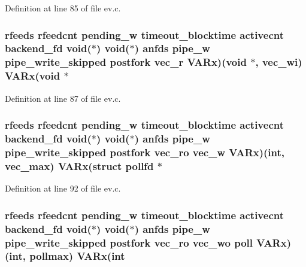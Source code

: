 \-Definition at line 85 of file ev.\-c.

\hypertarget{structev__loop_a0da6dfa7787cf08c7cc74dfa97686031}{
\subsubsection[{\-V\-A\-Rx}]{ {\bf rfeeds} {\bf rfeedcnt} {\bf pending\-\_\-w} {\bf timeout\-\_\-blocktime} {\bf activecnt} {\bf backend\-\_\-fd} void($\ast$) void($\ast$) {\bf anfds} {\bf pipe\-\_\-w} {\bf pipe\-\_\-write\-\_\-skipped} {\bf postfork} vec\-\_\-r {\bf \-V\-A\-Rx})(void $\ast$, {\bf vec\-\_\-wi}) {\bf \-V\-A\-Rx}(void $\ast$}}\label{structev__loop_a0da6dfa7787cf08c7cc74dfa97686031}


\-Definition at line 87 of file ev.\-c.

\hypertarget{structev__loop_a1207f4fd0019e46e4b57c9ae96b9cdd7}{
\subsubsection[{\-V\-A\-Rx}]{ {\bf rfeeds} {\bf rfeedcnt} {\bf pending\-\_\-w} {\bf timeout\-\_\-blocktime} {\bf activecnt} {\bf backend\-\_\-fd} void($\ast$) void($\ast$) {\bf anfds} {\bf pipe\-\_\-w} {\bf pipe\-\_\-write\-\_\-skipped} {\bf postfork} {\bf vec\-\_\-ro} vec\-\_\-w {\bf \-V\-A\-Rx})(int, {\bf vec\-\_\-max}) {\bf \-V\-A\-Rx}(struct pollfd $\ast$}}\label{structev__loop_a1207f4fd0019e46e4b57c9ae96b9cdd7}


\-Definition at line 92 of file ev.\-c.

\hypertarget{structev__loop_a0e284e844796b5ab0224266b15ef3a63}{
\subsubsection[{\-V\-A\-Rx}]{ {\bf rfeeds} {\bf rfeedcnt} {\bf pending\-\_\-w} {\bf timeout\-\_\-blocktime} {\bf activecnt} {\bf backend\-\_\-fd} void($\ast$) void($\ast$) {\bf anfds} {\bf pipe\-\_\-w} {\bf pipe\-\_\-write\-\_\-skipped} {\bf postfork} {\bf vec\-\_\-ro} {\bf vec\-\_\-wo} poll {\bf \-V\-A\-Rx})(int, {\bf pollmax}) {\bf \-V\-A\-Rx}(int}}\label{structev__loop_a0e284e844796b5ab0224266b15ef3a63}



